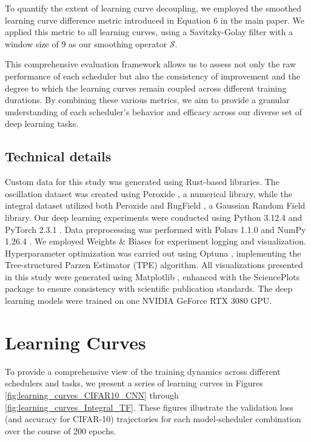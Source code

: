 \documentclass{article}
\theoremstyle{plain}
\theoremstyle{definition}
\theoremstyle{remark}
\begin{document}
To quantify the extent of learning curve decoupling, we employed the smoothed learning curve difference metric introduced in Equation 6 in the main paper.
We applied this metric to all learning curves, using a Savitzky-Golay filter with a window size of 9 as our smoothing operator $\mathcal{S}$.

This comprehensive evaluation framework allows us to assess not only the raw performance of each scheduler but also the consistency of improvement and the degree to which the learning curves remain coupled across different training durations.
By combining these various metrics, we aim to provide a granular understanding of each scheduler's behavior and efficacy across our diverse set of deep learning tasks.

\subsection{Technical details}

Custom data for this study was generated using Rust-based libraries.
The oscillation dataset was created using Peroxide \cite{peroxide}, a numerical library, while the integral dataset utilized both Peroxide and RugField \cite{rugfield}, a Gaussian Random Field library.
Our deep learning experiments were conducted using Python 3.12.4 and PyTorch 2.3.1 \cite{paszke2017automatic}.
Data preprocessing was performed with Polars 1.1.0 \cite{polars} and NumPy 1.26.4 \cite{harris2020array}.
We employed Weights \& Biases \cite{wandb} for experiment logging and visualization.
Hyperparameter optimization was carried out using Optuna \cite{optuna_2019}, implementing the Tree-structured Parzen Estimator (TPE) algorithm.
All visualizations presented in this study were generated using Matplotlib \cite{Hunter:2007}, enhanced with the SciencePlots \cite{SciencePlots} package to ensure consistency with scientific publication standards.
The deep learning models were trained on one NVIDIA GeForce RTX 3080 GPU.

\section{Learning Curves}
\label{sec:learning_curves}

To provide a comprehensive view of the training dynamics across different schedulers and tasks, we present a series of learning curves in Figures \ref{fig:learning_curves_CIFAR10_CNN} through \ref{fig:learning_curves_Integral_TF}.
These figures illustrate the validation loss (and accuracy for CIFAR-10) trajectories for each model-scheduler combination over the course of 200 epochs.
\end{document}
